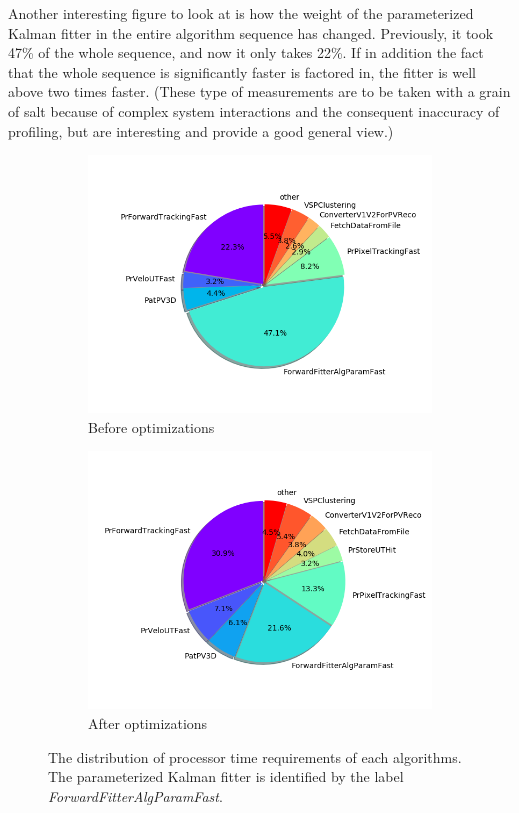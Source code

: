 \documentclass[12pt]{article}
\begin{document}
Another interesting figure to look at is how the weight of the parameterized Kalman fitter in the entire algorithm sequence has changed. Previously, it took 47\% of the whole sequence, and now it only takes 22\%. If in addition the fact that the whole sequence is significantly faster is factored in, the fitter is well above two times faster. \small (These type of measurements are to be taken with a grain of salt because of complex system interactions and the consequent inaccuracy of profiling, but are interesting and provide a good general view.) \normalsize

\begin{figure}[H]
	\centering
	\begin{subfigure}{.5\textwidth}
		\centering
		\includegraphics[width=.9\linewidth]{algo_usage_original_bestphys}
		\caption{Before optimizations}
	\end{subfigure}%
	\begin{subfigure}{.5\textwidth}
		\centering
		\includegraphics[width=.9\linewidth]{algo_usage_optkalman_bestphys}
		\caption{After optimizations}
	\end{subfigure}
	\caption{The distribution of processor time requirements of each algorithms. The parameterized Kalman fitter is identified by the label \textit{ForwardFitterAlgParamFast}.}
	\label{fig_kalmanfit_results_algousage}
\end{figure}
\end{document}
